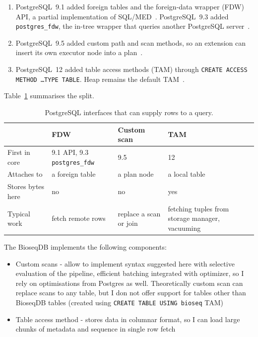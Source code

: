 \begin{enumerate}
  \item PostgreSQL~9.1 added foreign tables and the foreign-data wrapper (FDW) API, a partial implementation of SQL/MED~\autocite{postgresql91_release,postgresql17_ddl_foreign_data}.
        PostgreSQL~9.3 added \texttt{postgres\_fdw}, the in-tree wrapper that queries another PostgreSQL server~\autocite{postgresql93_release,postgresql17_postgres_fdw}.
  \item PostgreSQL~9.5 added custom path and scan methods, so an extension can insert its own executor node into a plan~\autocite{postgresql95_release,postgresql17_custom_scan}.
  \item PostgreSQL~12 added table access methods (TAM) through \texttt{CREATE ACCESS METHOD \ldots TYPE TABLE}.
        Heap remains the default TAM~\autocite{postgresql12_release,postgresql17_tableam}.
\end{enumerate}

Table~\ref{tab:pg-scan-extension-points} summarises the split.

\begin{table}[htbp]
\centering
\footnotesize
\caption{PostgreSQL interfaces that can supply rows to a query.}
\label{tab:pg-scan-extension-points}
\begin{tabular}{@{}p{}p{}p{}p{}@{}}
\toprule
 & FDW & Custom scan & TAM \\
\midrule
First in core
  & 9.1 API, 9.3 \texttt{postgres\_fdw}
  & 9.5
  & 12 \\
Attaches to
  & a foreign table
  & a plan node
  & a local table \\
Stores bytes here
  & no
  & no
  & yes \\
Typical work
  & fetch remote rows
  & replace a scan or join
  & fetching tuples from storage manager, vacuuming \\
\bottomrule
\end{tabular}
\end{table}

The BioseqDB implements the following components:
\begin{itemize}
  \item Custom scans - allow to implement syntax suggested here with selective evaluation of the pipeline, efficient batching integrated with optimizer, so I rely on optimisations from Postgres as well.
  Theoretically custom scan can replace scans to any table, but I don not offer support for tables other than BioseqDB tables (created using \texttt{CREATE TABLE USING bioseq} TAM)
  \item Table access method - stores data in columnar format, so I can load large chunks of metadata and sequence in single row fetch
\end{itemize}
